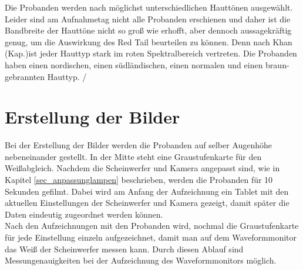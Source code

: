 Die Probanden werden nach möglichst unterschiedlichen Hauttönen ausgewählt. Leider sind am Aufnahmetag nicht alle Probanden erschienen und daher ist die Bandbreite der Hauttöne nicht so groß wie erhofft, aber dennoch aussagekräftig genug, um die Auswirkung des Red Tail beurteilen zu können. Denn nach Khan (Kap.)ist jeder Hauttyp stark im roten Spektralbereich vertreten. Die Probanden haben einen nordischen, einen südländischen, einen normalen und einen braun-gebrannten Hauttyp. /%

 
\section{Erstellung der Bilder}
\label{sec_erstellungbilder}
Bei der Erstellung der Bilder werden die Probanden auf selber Augenhöhe nebeneinander gestellt. In der Mitte steht eine Graustufenkarte für den Weißabgleich. Nachdem die Scheinwerfer und Kamera angepasst sind, wie in Kapitel \ref{sec_anpassunglampen} beschrieben, werden die Probanden für 10 Sekunden gefilmt. Dabei wird am Anfang der Aufzeichnung ein Tablet mit den aktuellen Einstellungen der Scheinwerfer und Kamera gezeigt, damit später die Daten eindeutig zugeordnet werden können.\\
Nach den Aufzeichnungen mit den Probanden wird, nochmal die Graustufenkarte für jede Einstellung einzeln aufgezeichnet, damit man auf dem Waveformmonitor das Weiß der Scheinwerfer messen kann. Durch diesen Ablauf sind Messungenauigkeiten bei der Aufzeichnung des Waveformmonitors möglich. 

